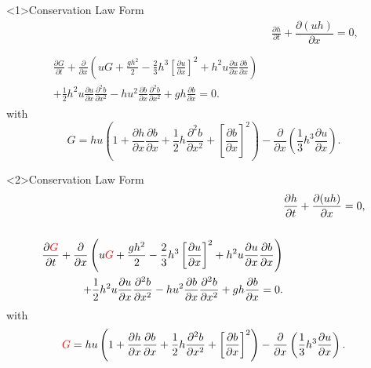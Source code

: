 \documentclass[pdf]{beamer}
\begin{document}
\begin{frame}<1>{Conservation Law Form}
	\begin{align*}
	& \frac{\partial h}{\partial t} + \dfrac{\partial (uh)}{\partial x} = 0,  \\ \nonumber \\
	\begin{split}
	\frac{\partial G}{\partial t}  + \frac{\partial}{\partial x} \left( {u} G + \frac{gh^2}{2} - \frac{2}{3}h^3 \left[\frac{\partial {u}}{\partial x}\right]^2 + h^2 {u}\frac{\partial {u}}{\partial x}\frac{\partial b}{\partial x} \right) \\ + \frac{1}{2}h^2 {u} \frac{\partial {u}}{\partial x} \frac{\partial^2 b}{\partial x^2}  - h {u}^2\frac{\partial b}{\partial x}\frac{\partial^2 b}{\partial x^2} + gh\frac{\partial b}{\partial x} = 0 .
	\end{split}
	\end{align*}
	\pause
	with
	\[ G =  h {u} \left(1 + \frac{\partial h}{\partial x}\frac{\partial b}{\partial x} + \frac{1}{2}h\frac{\partial^2 b}{\partial x^2} + \left[\frac{\partial b}{\partial x}\right]^2 \right) - \frac{\partial}{\partial x}\left(\frac{1}{3}h^3  \frac{\partial {u}}{\partial x}\right).\]
\end{frame}
\begin{frame}<2>{Conservation Law Form}
	\begin{align*}
	& \frac{\partial h}{\partial t} + \dfrac{\partial (uh)}{\partial x} = 0,  \\ \nonumber \\
	\begin{split}
	\frac{\partial { \color{red}G}}{\partial t}  + \frac{\partial}{\partial x} \left( {u} { \color{red}G} + \frac{gh^2}{2} - \frac{2}{3}h^3 \left[\frac{\partial {u}}{\partial x}\right]^2 + h^2 {u}\frac{\partial {u}}{\partial x}\frac{\partial b}{\partial x} \right) \\ + \frac{1}{2}h^2 {u} \frac{\partial {u}}{\partial x} \frac{\partial^2 b}{\partial x^2}  - h {u}^2\frac{\partial b}{\partial x}\frac{\partial^2 b}{\partial x^2} + gh\frac{\partial b}{\partial x} = 0 .
	\end{split}
	\end{align*}
	\pause
	with
	\[ { \color{red}G} =  h {u} \left(1 + \frac{\partial h}{\partial x}\frac{\partial b}{\partial x} + \frac{1}{2}h\frac{\partial^2 b}{\partial x^2} + \left[\frac{\partial b}{\partial x}\right]^2 \right) - \frac{\partial}{\partial x}\left(\frac{1}{3}h^3  \frac{\partial {u}}{\partial x}\right).\]
\end{frame}
\end{document}
